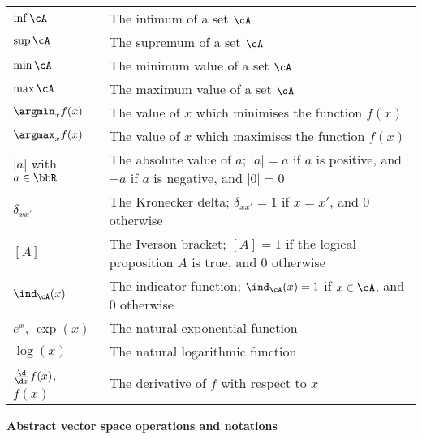 \begin{longtable}{p{}p{}}
  $\inf \cA$ & The infimum of a set $\cA$ \\  
  $\sup \cA$ & The supremum of a set $\cA$ \\  
  $\min \cA$ & The minimum value of a set $\cA$ \\   
  $\max \cA$ & The maximum value of a set $\cA$ \\   
  $\argmin_x f(x)$ & The value of $x$ which minimises the function $f(x)$ \\  
  $\argmax_x f(x)$ & The value of $x$ which maximises the function $f(x)$ \\              
  $\vert a \vert$ with $a\in\bbR$ & The absolute value of $a$; $\vert a \vert = a$ if $a$ is positive, and $-a$ if $a$ is negative, and $\vert 0 \vert = 0$ \\  
  $\delta_{xx'}$ & The Kronecker delta; $\delta_{xx'} = 1$ if $x = x'$, and 0 otherwise \\
  $[A]$ & The Iverson bracket; $[A] = 1$ if the logical proposition $A$ is true, and 0 otherwise \\
  $\ind_\cA(x)$ & The indicator function; $\ind_\cA(x) = 1$ if $x \in \cA$, and 0 otherwise \\  
  $e^x$, $\exp(x)$ & The natural exponential function \\
  $\log(x)$ & The natural logarithmic function \\
  $\frac{\d}{\d x} f(x)$, $\dot f(x)$ & The derivative of $f$ with respect to $x$ \\  
\end{longtable}

\newpage
\noindent\textbf{Abstract vector space operations and notations}

